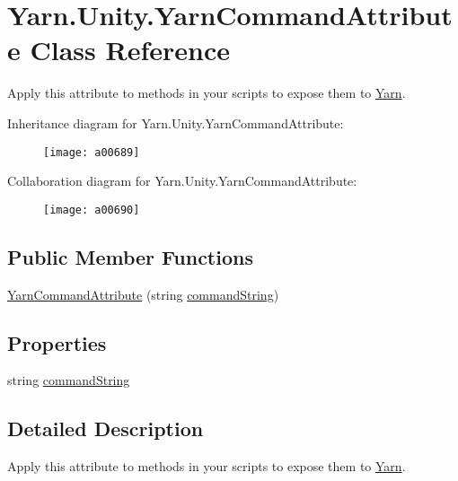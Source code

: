 \hypertarget{a00170}{\section{Yarn.\-Unity.\-Yarn\-Command\-Attribute Class Reference}
\label{a00170}
}


Apply this attribute to methods in your scripts to expose them to \hyperlink{a00048}{Yarn}.  




Inheritance diagram for Yarn.\-Unity.\-Yarn\-Command\-Attribute\-:
\nopagebreak
\begin{figure}[H]
\begin{center}
\leavevmode
\texttt{[image: a00689]}
\end{center}
\end{figure}


Collaboration diagram for Yarn.\-Unity.\-Yarn\-Command\-Attribute\-:
\nopagebreak
\begin{figure}[H]
\begin{center}
\leavevmode
\texttt{[image: a00690]}
\end{center}
\end{figure}
\subsection*{Public Member Functions}
\begin{DoxyCompactItemize}
\item 
\hyperlink{a00170_a9c0d57cd72c091f63895944959e98330}{Yarn\-Command\-Attribute} (string \hyperlink{a00170_a6d513a725c819ffcdaa9c5788472ec8d}{command\-String})
\end{DoxyCompactItemize}
\subsection*{Properties}
\begin{DoxyCompactItemize}
\item 
string \hyperlink{a00170_a6d513a725c819ffcdaa9c5788472ec8d}{command\-String}
\end{DoxyCompactItemize}


\subsection{Detailed Description}
Apply this attribute to methods in your scripts to expose them to \hyperlink{a00048}{Yarn}. 


